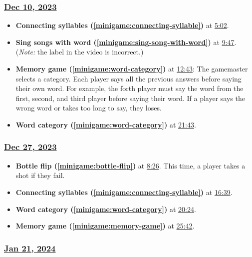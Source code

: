 \documentclass{article}
\begin{document}
\subsubsection{\href{https://youtu.be/GDnfvIGU6Po}{Dec 10, 2023}}

\begin{itemize}
    \item \textbf{Connecting syllables (\ref{minigame:connecting-syllable})} at \href{https://youtu.be/GDnfvIGU6Po?t=302}{5:02}.
    \item \textbf{Sing songs with word (\ref{minigame:sing-song-with-word})} at \href{https://youtu.be/GDnfvIGU6Po?&t=587}{9:47}. (\textit{Note:} the label in the video is incorrect.)
    \item \textbf{Memory game (\ref{minigame:word-category})} at \href{https://youtu.be/GDnfvIGU6Po?t=768}{12:43}: The gamemaster selects a category. Each player says all the previous answers before saying their own word.  For example, the forth player must say the word from the first, second, and third player before saying their word. If a player says the wrong word or takes too long to say, they loses. \label{minigame:memory-game}
    \item \textbf{Word category (\ref{minigame:word-category})} at \href{https://youtu.be/GDnfvIGU6Po?&t=1303}{21:43}.
\end{itemize}


\subsubsection{\href{https://youtu.be/7mI6c84TuFc}{Dec 27, 2023}}

\begin{itemize}
    \item \textbf{Bottle flip (\ref{minigame:bottle-flip})} at \href{https://youtu.be/7mI6c84TuFc?t=506}{8:26}. This time, a player takes a shot if they fail.
    \item \textbf{Connecting syllables (\ref{minigame:connecting-syllable})} at \href{https://youtu.be/7mI6c84TuFc?t=999}{16:39}.
    \item \textbf{Word category (\ref{minigame:word-category})} at \href{https://youtu.be/7mI6c84TuFc?t=1224}{20:24}.
    \item \textbf{Memory game (\ref{minigame:memory-game})} at \href{https://youtu.be/7mI6c84TuFc?t=1542}{25:42}.
\end{itemize}

\subsubsection{\href{https://youtu.be/4FlOWGefcI0}{Jan 21, 2024}}
\end{document}

